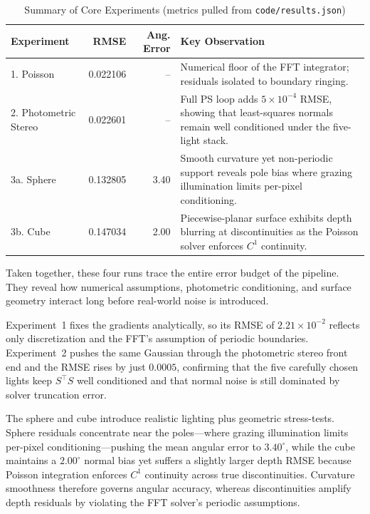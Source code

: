 \documentclass[11pt]{article}
\begin{document}
\begin{table}[h]
\centering
\caption{Summary of Core Experiments (metrics pulled from \texttt{code/results.json})}
\begin{tabularx}{\textwidth}{|l|r|r|>{\raggedright\arraybackslash}X|}
\hline
\textbf{Experiment} & \textbf{RMSE} & \textbf{Ang. Error} & \textbf{Key Observation} \\
\hline
1. Poisson & 0.022106 & -- & Numerical floor of the FFT integrator; residuals isolated to boundary ringing. \\
2. Photometric Stereo & 0.022601 & -- & Full PS loop adds $5\times10^{-4}$ RMSE, showing that least-squares normals remain well conditioned under the five-light stack. \\
3a. Sphere & 0.132805 & 3.40 & Smooth curvature yet non-periodic support reveals pole bias where grazing illumination limits per-pixel conditioning. \\
3b. Cube & 0.147034 & 2.00 & Piecewise-planar surface exhibits depth blurring at discontinuities as the Poisson solver enforces $C^1$ continuity. \\
\hline
\end{tabularx}
\end{table}

Taken together, these four runs trace the entire error budget of the pipeline. They reveal how numerical assumptions, photometric conditioning, and surface geometry interact long before real-world noise is introduced.

Experiment~1 fixes the gradients analytically, so its RMSE of $2.21\times10^{-2}$ reflects only discretization and the FFT’s assumption of periodic boundaries. Experiment~2 pushes the same Gaussian through the photometric stereo front end and the RMSE rises by just $0.0005$, confirming that the five carefully chosen lights keep $S^\top S$ well conditioned and that normal noise is still dominated by solver truncation error.

The sphere and cube introduce realistic lighting plus geometric stress-tests. Sphere residuals concentrate near the poles—where grazing illumination limits per-pixel conditioning—pushing the mean angular error to $3.40^{\circ}$, while the cube maintains a $2.00^{\circ}$ normal bias yet suffers a slightly larger depth RMSE because Poisson integration enforces $C^1$ continuity across true discontinuities. Curvature smoothness therefore governs angular accuracy, whereas discontinuities amplify depth residuals by violating the FFT solver’s periodic assumptions.
\end{document}
